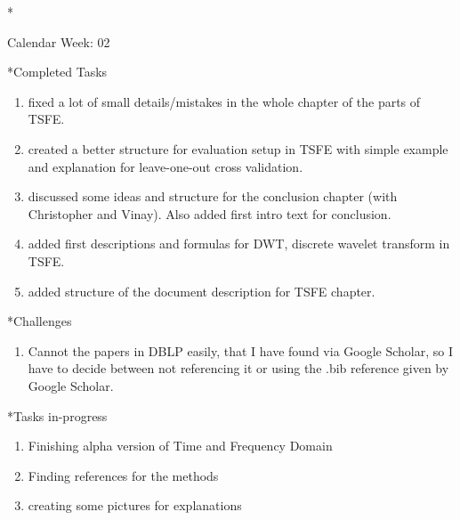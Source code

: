 \documentclass[11pt,a4paper]{article}
\begin{document}
\newpage
\begin{section}*{Calendar Week: 02 \hfill \date{15 January, 2021}}
	
	\begin{subsection}*{Completed Tasks}
		\begin{enumerate}
			\item fixed a lot of small details/mistakes in the whole chapter of the parts of TSFE.
			\item created a better structure for evaluation setup in TSFE with simple example and explanation for leave-one-out cross validation.
			\item discussed some ideas and structure for the conclusion chapter (with Christopher and Vinay). Also added first intro text for conclusion.
			\item added first descriptions and formulas for DWT, discrete wavelet transform in TSFE.
			\item added structure of the document description for TSFE chapter.
		\end{enumerate}
	\end{subsection}
	
	\begin{subsection}*{Challenges}
		\begin{enumerate}
			\item Cannot the papers in DBLP easily, that I have found via Google Scholar, so I have to decide between not referencing it or using the .bib reference given by Google Scholar.
		\end{enumerate}
	\end{subsection}
	
	\begin{subsection}*{Tasks in-progress}
		\begin{enumerate}
			\item Finishing alpha version of Time and Frequency Domain
			\item Finding references for the methods
			\item creating some pictures for explanations
		\end{enumerate}
	\end{subsection}
\end{section}
\end{document}
